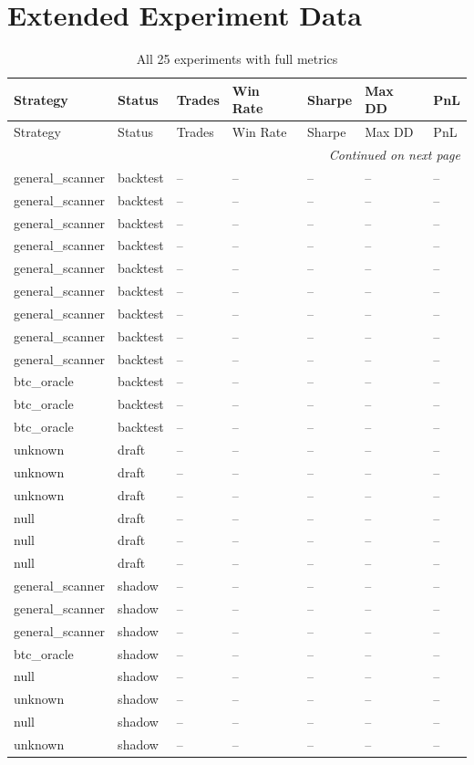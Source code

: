 \documentclass[11pt]{article}
\begin{document}
\section{Extended Experiment Data}
\label{sec:experiments}

\begin{longtable}{p{2.5cm}p{1.5cm}p{1.2cm}p{1.8cm}p{1.2cm}p{1.8cm}p{1.5cm}}
\caption{All 25 experiments with full metrics} \label{tab:experiments} \\
\toprule
Strategy & Status & Trades & Win Rate & Sharpe & Max DD & PnL \\
\midrule
\endfirsthead
\toprule
Strategy & Status & Trades & Win Rate & Sharpe & Max DD & PnL \\
\midrule
\endhead
\midrule
\multicolumn{7}{r}{\textit{Continued on next page}} \\
\endfoot
\bottomrule
\endlastfoot

general\_scanner & backtest & -- & -- & -- & -- & -- \\
general\_scanner & backtest & -- & -- & -- & -- & -- \\
general\_scanner & backtest & -- & -- & -- & -- & -- \\
general\_scanner & backtest & -- & -- & -- & -- & -- \\
general\_scanner & backtest & -- & -- & -- & -- & -- \\
general\_scanner & backtest & -- & -- & -- & -- & -- \\
general\_scanner & backtest & -- & -- & -- & -- & -- \\
general\_scanner & backtest & -- & -- & -- & -- & -- \\
general\_scanner & backtest & -- & -- & -- & -- & -- \\
btc\_oracle & backtest & -- & -- & -- & -- & -- \\
btc\_oracle & backtest & -- & -- & -- & -- & -- \\
btc\_oracle & backtest & -- & -- & -- & -- & -- \\
unknown & draft & -- & -- & -- & -- & -- \\
unknown & draft & -- & -- & -- & -- & -- \\
unknown & draft & -- & -- & -- & -- & -- \\
null & draft & -- & -- & -- & -- & -- \\
null & draft & -- & -- & -- & -- & -- \\
null & draft & -- & -- & -- & -- & -- \\
general\_scanner & shadow & -- & -- & -- & -- & -- \\
general\_scanner & shadow & -- & -- & -- & -- & -- \\
general\_scanner & shadow & -- & -- & -- & -- & -- \\
btc\_oracle & shadow & -- & -- & -- & -- & -- \\
null & shadow & -- & -- & -- & -- & -- \\
unknown & shadow & -- & -- & -- & -- & -- \\
null & shadow & -- & -- & -- & -- & -- \\
unknown & shadow & -- & -- & -- & -- & -- \\


\end{longtable}
\end{document}
